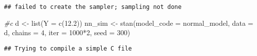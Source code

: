 \documentclass[
]{article}
\newenvironment{Shaded}{\begin{snugshade}}{\end{snugshade}}
\newcommand{\AttributeTok}[1]{\textcolor[rgb]{0.77,0.63,0.00}{#1}}
\newcommand{\CommentTok}[1]{\textcolor[rgb]{0.56,0.35,0.01}{\textit{#1}}}
\newcommand{\DecValTok}[1]{\textcolor[rgb]{0.00,0.00,0.81}{#1}}
\newcommand{\FloatTok}[1]{\textcolor[rgb]{0.00,0.00,0.81}{#1}}
\newcommand{\FunctionTok}[1]{\textcolor[rgb]{0.00,0.00,0.00}{#1}}
\newcommand{\NormalTok}[1]{#1}
\newcommand{\OtherTok}[1]{\textcolor[rgb]{0.56,0.35,0.01}{#1}}
\newcommand{\SpecialCharTok}[1]{\textcolor[rgb]{0.00,0.00,0.00}{#1}}
\begin{document}
\begin{verbatim}
## failed to create the sampler; sampling not done
\end{verbatim}

\begin{Shaded}
\begin{Highlighting}[]
\CommentTok{\#c}
\NormalTok{d }\OtherTok{\textless{}{-}} \FunctionTok{list}\NormalTok{(}\AttributeTok{Y =} \FunctionTok{c}\NormalTok{(}\FloatTok{12.2}\NormalTok{))}
\NormalTok{nn\_sim }\OtherTok{\textless{}{-}} \FunctionTok{stan}\NormalTok{(}\AttributeTok{model\_code =}\NormalTok{ normal\_model, }\AttributeTok{data =}\NormalTok{ d, }
               \AttributeTok{chains =} \DecValTok{4}\NormalTok{, }\AttributeTok{iter =} \DecValTok{1000}\SpecialCharTok{*}\DecValTok{2}\NormalTok{, }\AttributeTok{seed =} \DecValTok{300}\NormalTok{)}
\end{Highlighting}
\end{Shaded}

\begin{verbatim}
## Trying to compile a simple C file
\end{verbatim}
\end{document}
